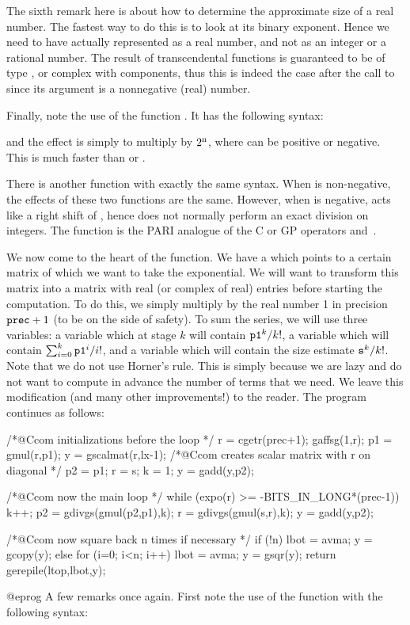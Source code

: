 {The sixth remark here is about how to determine the approximate size
of a real number. The fastest way to do this is to look at its binary
exponent. Hence we need to have  actually represented as a real number,
and not as an integer or a rational number. The result of transcendental
functions is guaranteed to be of type , or complex with 
components, thus this is indeed the case after the call to  since
its argument is a nonnegative (real) number.

Finally, note the use of the function . It has the following
syntax:


\noindent and the effect is simply to multiply  by $2^{\text n}$,
where  can be positive or negative. This is much faster than
 or .

There is another function  with exactly the same syntax.
When  is non-negative, the effects of these two functions are the same.
However, when  is negative,  acts like a right shift of
, hence does not normally perform an exact division on integers. The
function   is the PARI analogue of the C or GP operators \kbd{<<}
and~\kbd{>>}.

We now come to the heart of the function. We have a   which
points to a certain matrix of which we want to take the exponential. We will
want to transform this matrix into a matrix with real (or complex of real)
entries before starting the computation. To do this, we simply multiply by
the real number 1 in precision $\kbd{prec}+1$ (to be on the side of safety).
To sum the series, we will use three variables: a variable  which at
stage $k$ will contain $\kbd{p1}^k/k!$, a variable  which will contain
$\sum_{i=0}^k \kbd{p1}^i/i!$, and a variable  which will contain the
size estimate $\kbd{s}^k/k!$. Note that we do not use Horner's rule. This is
simply because we are lazy and do not want to compute in advance the number
of terms that we need. We leave this modification (and many other
improvements!) to the reader. The program continues as follows:

\bprog
  /*@Ccom initializations before the loop */
  r = cgetr(prec+1); gaffsg(1,r); p1 = gmul(r,p1);
  y = gscalmat(r,lx-1); /*@Ccom creates scalar matrix with r on diagonal */
  p2 = p1; r = s; k = 1;
  y = gadd(y,p2);

  /*@Ccom now the main loop */
  while (expo(r) >= -BITS_IN_LONG*(prec-1))
  {
    k++; p2 = gdivgs(gmul(p2,p1),k);
    r = gdivgs(gmul(s,r),k); y = gadd(y,p2);
  }

  /*@Ccom now square back n times if necessary */
  if (!n) { lbot = avma; y = gcopy(y); }
  else
  {
    for (i=0; i<n; i++) { lbot = avma; y = gsqr(y); }
  }
  return gerepile(ltop,lbot,y);
}@eprog
\noindent
A few remarks once again. First note the use of the function
 with the following syntax:

